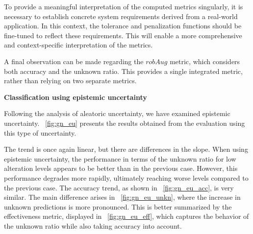 To provide a meaningful interpretation of the computed metrics singularly, it is necessary to establish concrete system requirements derived from a real-world application. In this context, the tolerance and penalization functions should be fine-tuned to reflect these requirements. This will enable a more comprehensive and context-specific interpretation of the metrics.

A final observation can be made regarding the $robAug$ metric, which considers both accuracy and the unknown ratio. This provides a single integrated metric, rather than relying on two separate metrics.

\vspace{0.3cm}
\textbf{Classification using epistemic uncertainty}
\vspace{0.1cm}

Following the analysis of aleatoric uncertainty, we have examined epistemic uncertainty. \Fig~\ref{fig:gn_eu} presents the results obtained from the evaluation using this type of uncertainty.

The trend is once again linear, but there are differences in the slope. When using epistemic uncertainty, the performance in terms of the unknown ratio for low alteration levels appears to be better than in the previous case. However, this performance degrades more rapidly, ultimately reaching worse levels compared to the previous case. The accuracy trend, as shown in \Fig~\ref{fig:gn_eu_acc}, is very similar. The main difference arises in \Fig~\ref{fig:gn_eu_unkn}, where the increase in unknown predictions is more pronounced. This is better summarized by the effectiveness metric, displayed in \Fig~\ref{fig:gn_eu_eff}, which captures the behavior of the unknown ratio while also taking accuracy into account.

